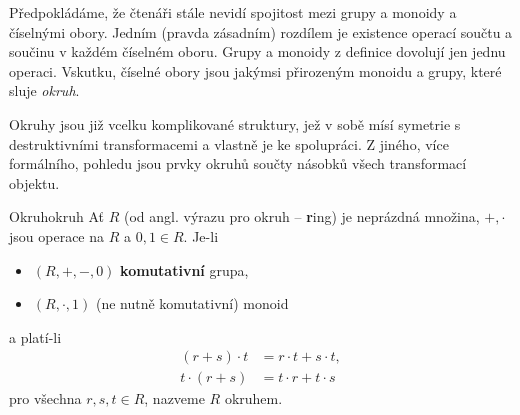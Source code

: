 Předpokládáme, že čtenáři stále nevidí spojitost mezi grupy a monoidy a
číselnými obory. Jedním (pravda zásadním) rozdílem je existence operací součtu a
součinu v každém číselném oboru. Grupy a monoidy z definice dovolují jen jednu
operaci. Vskutku, číselné obory jsou jakýmsi přirozeným  monoidu a
grupy, které sluje \emph{okruh}.

Okruhy jsou již vcelku komplikované struktury, jež v sobě mísí symetrie s
destruktivními transformacemi a vlastně je  ke spolupráci. Z
jiného, více formálního, pohledu jsou prvky okruhů součty násobků všech
transformací objektu.

\begin{definition}{Okruh}{okruh}
 Ať $R$ (od angl. výrazu pro okruh -- \textbf{r}ing) je neprázdná množina, $+,
 \cdot $ jsou operace na $R$ a $0,1 \in R$. Je-li
 \begin{itemize}
  \item $(R,+,-,0)$ \textbf{komutativní} grupa,
  \item $(R, \cdot ,1)$ (ne nutně komutativní) monoid
 \end{itemize}
 a platí-li 
 \begin{equation}
  \label{eq:distributivita}
  \begin{split}
   (r + s) \cdot t &= r \cdot t + s \cdot t,\\
   t \cdot (r + s) &= t \cdot r + t \cdot s
  \end{split}
 \end{equation}
 pro všechna $r,s,t \in R$, nazveme $R$ okruhem. 
\end{definition}

